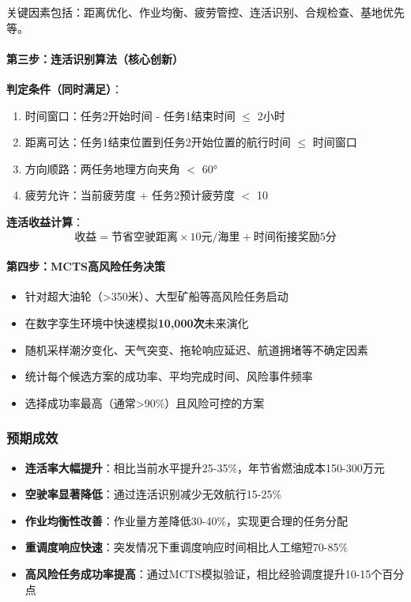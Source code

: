 \documentclass[12pt,a4paper]{article}
\begin{document}
关键因素包括：距离优化、作业均衡、疲劳管控、连活识别、合规检查、基地优先等。

\paragraph{第三步：连活识别算法（核心创新）}

\textbf{判定条件（同时满足）}：

\begin{enumerate}[leftmargin=*]
    \item 时间窗口：任务2开始时间 - 任务1结束时间 $\leq$ 2小时
    \item 距离可达：任务1结束位置到任务2开始位置的航行时间 $\leq$ 时间窗口
    \item 方向顺路：两任务地理方向夹角 $<$ 60°
    \item 疲劳允许：当前疲劳度 + 任务2预计疲劳度 $<$ 10
\end{enumerate}

\textbf{连活收益计算}：
\[
\text{收益} = \text{节省空驶距离} \times 10\text{元/海里} + \text{时间衔接奖励}5\text{分}
\]

\paragraph{第四步：MCTS高风险任务决策}

\begin{itemize}[leftmargin=*]
    \item 针对超大油轮（>350米）、大型矿船等高风险任务启动
    \item 在数字孪生环境中快速模拟\textbf{10,000次}未来演化
    \item 随机采样潮汐变化、天气突变、拖轮响应延迟、航道拥堵等不确定因素
    \item 统计每个候选方案的成功率、平均完成时间、风险事件频率
    \item 选择成功率最高（通常>90\%）且风险可控的方案
\end{itemize}

\subsubsection{预期成效}

\begin{itemize}[leftmargin=*]
    \item[\checkmark] \textbf{连活率大幅提升}：相比当前水平提升25-35\%，年节省燃油成本150-300万元
    \item[\checkmark] \textbf{空驶率显著降低}：通过连活识别减少无效航行15-25\%
    \item[\checkmark] \textbf{作业均衡性改善}：作业量方差降低30-40\%，实现更合理的任务分配
    \item[\checkmark] \textbf{重调度响应快速}：突发情况下重调度响应时间相比人工缩短70-85\%
    \item[\checkmark] \textbf{高风险任务成功率提高}：通过MCTS模拟验证，相比经验调度提升10-15个百分点
\end{itemize}
\end{document}
